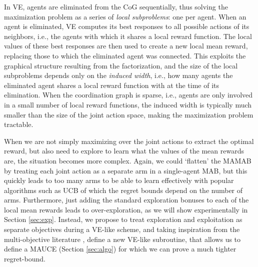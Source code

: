 \documentclass{article}
\begin{document}
In VE, agents are eliminated from the CoG sequentially, thus solving the maximization problem as a series of \emph{local subproblems}: one per agent. When an agent is eliminated, VE computes its best responses to all possible actions of its neighbors, i.e., the agents with which it shares a local reward function. The local values of these best responses are then used to create a new local mean reward, replacing those to which the eliminated agent was connected. This exploits the graphical structure resulting from the factorization, and the size of the local subproblems depends only on the \emph{induced width}, i.e., how many agents the eliminated agent shares a local reward function with at the time of its elimination. When the coordination graph is sparse, i.e., agents are only involved in a small number of local reward functions, the induced width is typically much smaller than the size of the joint action space, making the maximization problem tractable.

When we are not simply maximizing over the joint actions to extract the optimal reward, but also need to explore to learn what the values of the mean rewards are, the situation becomes more complex. Again, we could `flatten' the MAMAB by treating each joint action as a separate arm in a single-agent MAB, but this quickly leads to too many arms to be able to learn effectively with popular algorithms such as UCB \cite{auer2002finite} of which the regret bounds depend on the number of arms. Furthermore, just adding the standard exploration bonuses to each of the local mean rewards leads to over-exploration, as we will show experimentally in Section \ref{sec:exp}. Instead, we propose to treat exploration and exploitation as separate objectives during a VE-like scheme, and taking inspiration from the multi-objective literature \cite{roijers2015computing}, define a new VE-like subroutine, that allows us to define a MAUCE (Section \ref{sec:algo}) for which we can prove a much tighter regret-bound.
\end{document}
